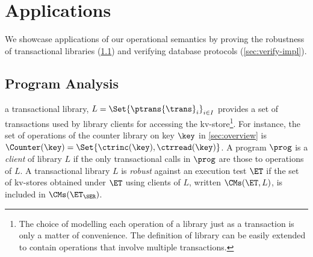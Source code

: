 \section{Applications}
\label{sec:applications}

We showcase applications of our operational semantics by proving the
robustness of transactional libraries (\cref{sec:program-analysis})
and verifying database protocols
 (\cref{sec:verify-impl}).

\subsection{Program Analysis}
\label{sec:program-analysis}
a transactional library, $L =
\Set{\ptrans{\trans}_{i}}_{i \in I}$
provides  a set of transactions  used by  library clients for accessing  the
kv-store\footnote{The choice of modelling each operation of a library
  just  as a transaction is only a 
matter of convenience. The definition of library can be easily extended to contain operations that involve multiple transactions.}. 
For instance, the set of operations of the counter library on key $\key$ in \cref{sec:overview} is $\Counter(\key) = \Set{\ctrinc(\key), \ctrread(\key)}$.
A program $\prog$ is a \emph{client} of library $L$ if  the only transactional calls in $\prog$ are those to operations of $L$.  
A transactional library $L$ is \emph{robust} against an execution test
$\ET$ if the set of kv-stores obtained under $\ET$ using 
clients of  $L$, written $\CMs(\ET, L)$, is included in
$\CMs(\ET_{\SER})$. 

